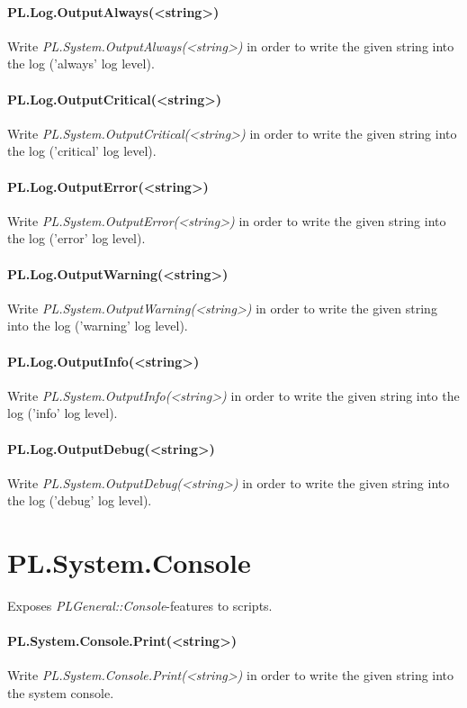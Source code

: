 \paragraph{PL.Log.OutputAlways(<string>)}
Write \emph{PL.System.OutputAlways(<string>)} in order to write the given string into the log ('always' log level).


\paragraph{PL.Log.OutputCritical(<string>)}
Write \emph{PL.System.OutputCritical(<string>)} in order to write the given string into the log ('critical' log level).


\paragraph{PL.Log.OutputError(<string>)}
Write \emph{PL.System.OutputError(<string>)} in order to write the given string into the log ('error' log level).


\paragraph{PL.Log.OutputWarning(<string>)}
Write \emph{PL.System.OutputWarning(<string>)} in order to write the given string into the log ('warning' log level).


\paragraph{PL.Log.OutputInfo(<string>)}
Write \emph{PL.System.OutputInfo(<string>)} in order to write the given string into the log ('info' log level).


\paragraph{PL.Log.OutputDebug(<string>)}
Write \emph{PL.System.OutputDebug(<string>)} in order to write the given string into the log ('debug' log level).




\section{PL.System.Console}
Exposes \emph{PLGeneral::Console}-features to scripts.


\paragraph{PL.System.Console.Print(<string>)}
Write \emph{PL.System.Console.Print(<string>)} in order to write the given string into the system console.





